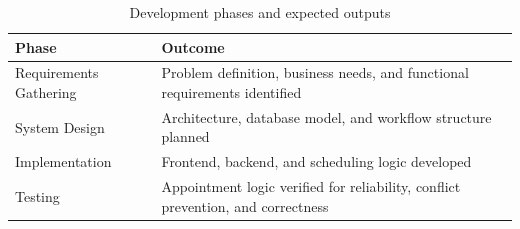 \begin{table}[h]
\centering
\caption{Development phases and expected outputs}
\begin{tabular}{|p{3.5cm}|p{8cm}|}
\hline
\textbf{Phase} & \textbf{Outcome} \\
\hline
Requirements Gathering & Problem definition, business needs, and functional requirements identified \\
\hline
System Design & Architecture, database model, and workflow structure planned \\
\hline
Implementation & Frontend, backend, and scheduling logic developed \\
\hline
Testing & Appointment logic verified for reliability, conflict prevention, and correctness \\
\hline
\end{tabular}
\end{table}
